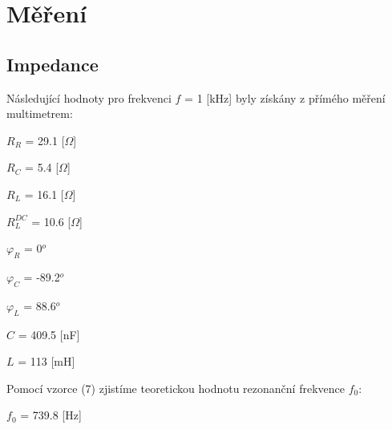 \documentclass[a4paper,11pt]{article}
\begin{document}
\begin{minipage}[t]{0.5\textwidth}
    \section{Měření}  
        \subsection{Impedance}
            Následující hodnoty pro frekvenci $f$ = 1 [kHz] byly získány z přímého měření multimetrem:
            \vspace{10pt}
            \par 
            \begin{minipage}[t]{0.3\textwidth} 
                $R_R$ = 29.1 [$\Omega$]
                \vspace{3pt}
                \par $R_C$ = 5.4 [$\Omega$]
                \vspace{3pt}
                \par $R_L$ = 16.1 [$\Omega$]
                \vspace{3pt}
                \par $R_L^{DC}$ = 10.6 [$\Omega$]
            \end{minipage}
            \hspace{5pt}
            \begin{minipage}[t]{0.3\textwidth} 
                $\varphi_R$ = 0$^o$
                \vspace{3pt}
                \par $\varphi_C$ = -89.2$^o$
                \vspace{3pt}
                \par $\varphi_L$ = 88.6$^o$
            \end{minipage}
            \hspace{-3pt}
            \begin{minipage}[t]{0.3\textwidth} 
                \vspace{5pt}
                $C$ = 409.5 [nF]
                \par $L$ = 113 [mH]
            \end{minipage}
            \par 
            \vspace{10pt}
            Pomocí vzorce (7) zjistíme teoretickou hodnotu rezonanční frekvence $f_0$: 
            \begin{center}
                $f_0$ = 739.8 [Hz]
            \end{center}
\end{minipage}
\end{document}
